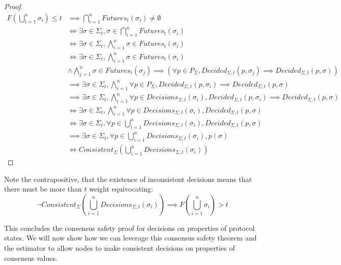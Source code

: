 \begin{proof}
\begin{align}
F(\bigcup_{i=1}^n \sigma_i) \leq t &\implies \bigcap_{i=1}^n Futures_t(\sigma_i) \neq \emptyset \\
&\iff \exists \sigma \in \Sigma_t, \sigma \in \bigcap_{i = 1}^n Futures_t(\sigma_i) \\
&\iff \exists \sigma \in \Sigma_t, \bigwedge_{i = 1}^n \sigma \in Futures_t(\sigma_i) \\
&\iff \exists \sigma \in \Sigma_t, \bigwedge_{i = 1}^n \sigma \in Futures_t(\sigma_i)  \\
&\land \bigwedge_{j = 1}^n \sigma \in Futures_t(\sigma_j) \implies (\forall p \in P_\Sigma, Decided_{\Sigma, t}(p,\sigma_j) \implies Decided_{\Sigma, t}(p, \sigma)) \\
&\implies \exists \sigma \in \Sigma_t,\bigwedge_{i = 1}^n \forall p \in P_\Sigma, Decided_{\Sigma, t}(p,\sigma_i) \implies Decided_{\Sigma, t}(p, \sigma) \\
&\implies \exists \sigma \in \Sigma_t,\bigwedge_{i = 1}^n \forall p \in Decisions_{\Sigma,t}(\sigma_i), Decided_{\Sigma, t}(p,\sigma_i) \implies Decided_{\Sigma, t}(p, \sigma)\\
&\iff \exists \sigma \in \Sigma_t, \bigwedge_{i = 1}^n \forall p \in Decisions_{\Sigma,t}(\sigma_i), Decided_{\Sigma, t}(p, \sigma)\\
&\iff \exists \sigma \in \Sigma_t, \forall p \in \bigcup_{i=1}^n Decisions_{\Sigma,t}(\sigma_i), Decided_{\Sigma, t}(p, \sigma)\\
&\implies \exists \sigma \in \Sigma_t, \forall p \in \bigcup_{i=1}^n Decisions_{\Sigma,t}(\sigma_i), p(\sigma)\\
&\iff Consistent_\Sigma(\bigcup_{i=1}^n Decisions_{\Sigma,t}(\sigma_i))
\end{align}
\end{proof}


Note the contrapositive, that the existence of inconsistent decisions means that there must be more than $t$ weight equivocating:
$$
\neg Consistent_\Sigma(\bigcup_{i=1}^n Decisions_{\Sigma,t}(\sigma_i)) \implies F(\bigcup_{i=1}^n \sigma_i) > t
$$

This concludes the consensus safety proof for decisions on properties of protocol states. We will now show how we can leverage this consensus safety theorem and the estimator to allow nodes to make consistent decisions on properties of consensus values.
